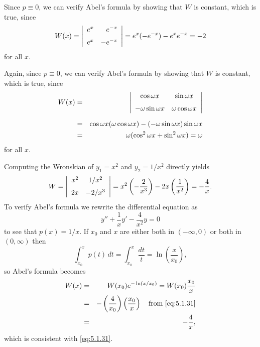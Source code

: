 \begin{examplesolution}
 Since $p\equiv0$, we can verify Abel's formula by showing that $W$ is constant,
which is true, since
\[
  W(x)=\left|
  \begin{array}{rr}
    e^{x} & e^{-x}  \\[2\jot]
    e^{x} & -e^{-x}
  \end{array}\right|=e^{x}(-e^{-x})-e^{x}e^{-x}=-2
\]
for all $x$.

 Again, since $p\equiv0$, we can verify Abel's formula by showing that $W$ is
constant, which is true, since
\begin{eqnarray*}
  W(x)&=&\displaystyle{\left|\begin{array}{cc}\cos\omega x&\sin\omega x\\[2\jot] -\omega\sin\omega x&\omega\cos\omega x\end{array}\right|}\\[2\jot] &=&\cos\omega x(\omega\cos\omega x)-(-\omega\sin\omega x)\sin\omega x\\&=&\omega(\cos^{2}\omega x+\sin^{2}\omega x)=\omega
\end{eqnarray*}
for all $x$.

 Computing the Wronskian of $y_{1}=x^{2}$ and $y_{2}=1/x^{2}$ directly yields
\begin{equation}
  \label{eq:5.1.31}W=\left|
  \begin{array}{cc}
    x^{2} & 1/x^{2}  \\[2\jot]
    2x    & -2/x^{3}
  \end{array}\right|=x^{2}\left(-\frac{2}{x^{3}}\right)-2x\left(\frac{1}{x^{2}}\right)=-\frac{4}{x}.
\end{equation}
To verify Abel's formula we rewrite the differential equation as
\[
  y''+\frac{1}{x}y'-\frac{4}{x^{2}}y=0
\]
to see that $p(x)=1/x$. If $x_{0}$ and $x$ are either both in $(-\infty,0)$ or both in $(0,\infty)$
then
\[
  \int_{x_{0}}^{x}p(t)\,dt=\int_{x_{0}}^{x}\frac{dt}{t}=\ln\left(\frac{x}{x_{0}}\right),
\]
so Abel's formula becomes
\begin{eqnarray*}
  W(x) & = & W(x_{0})e^{-\ln(x/x_{0})}=W(x_{0})\frac{x_{0}}{x}                                            \\
       & = & -\left(\frac{4}{x_{0}}\right)\left(\frac{x_{0}}{x}\right)\mbox{\quad from \eqref{eq:5.1.31}} \\
       & = & -\frac{4}{x},
\end{eqnarray*}
which is consistent with \eqref{eq:5.1.31}.\bbox
\end{examplesolution}

